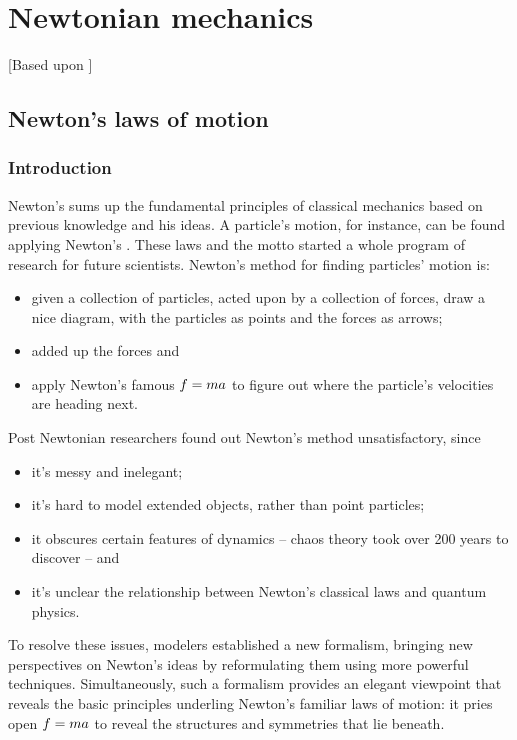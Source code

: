 \chapter{Newtonian mechanics}
%
[Based upon \citep{tong:2004}]


\section{Newton's laws of motion}
%
\subsection{Introduction}
%
Newton's  sums up the fundamental principles of classical mechanics based on previous knowledge and his ideas. A particle's motion, for instance, can be found applying Newton's . These laws and the motto  started a whole program of research for future scientists.
%
%
Newton's method for finding particles' motion is:
%
\begin{itemize}
%
\item given a collection of particles, acted upon by a collection of forces, draw a nice diagram, with the particles as points and the forces as arrows;
%
\item added up the forces and 
%
\item apply Newton's famous $f = ma$ to figure out where the particle's velocities are heading next. 
%
\end{itemize}

Post Newtonian researchers found out Newton's method unsatisfactory, since
%
\begin{itemize}
%
\item it's messy and inelegant; 
%
\item it's hard to model extended objects, rather than point particles; 
%
\item it obscures certain features of dynamics -- chaos theory took over 200 years to discover -- and 
%
\item it's unclear the relationship between Newton's classical laws and quantum physics.
%
\end{itemize}

To resolve these issues, modelers established a new formalism, bringing new perspectives on Newton's ideas by reformulating them using more powerful techniques.
%
%
Simultaneously, such a formalism provides an elegant viewpoint that reveals the basic principles underling Newton's familiar laws of motion: it pries open $f = ma$ to reveal the structures and symmetries that lie beneath.

